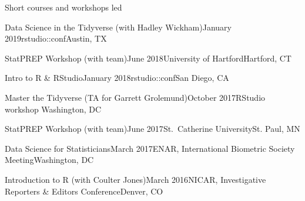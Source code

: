 \documentclass{resume} %
\begin{document}
\begin{rSection}{Short courses and workshops led}
\begin{sSubsection}{Data Science in the Tidyverse}{ (with Hadley Wickham)}{January 2019}{rstudio::conf}{Austin, TX}
\end{sSubsection}

\begin{sSubsection}{StatPREP Workshop}{ (with team)}{June 2018}{University of Hartford}{Hartford, CT}
\end{sSubsection}

\begin{sSubsection}{Intro to R \& RStudio}{}{January 2018}{rstudio::conf}{San Diego, CA}
\end{sSubsection}

\begin{sSubsection}{Master the Tidyverse}{ (TA for Garrett Grolemund)}{October 2017}{RStudio workshop }{Washington, DC}
\end{sSubsection}

\begin{sSubsection}{StatPREP Workshop}{ (with team)}{June 2017}{St.~Catherine University}{St. Paul, MN}
\end{sSubsection}

\begin{sSubsection}{Data Science for Statisticians}{}{March 2017}{ENAR, International Biometric Society Meeting}{Washington, DC}
\end{sSubsection}

\begin{sSubsection}{Introduction to R }{(with Coulter Jones)}{March 2016}{NICAR, Investigative Reporters \& Editors Conference}{Denver, CO}
\end{sSubsection}



\end{rSection}
\end{document}
